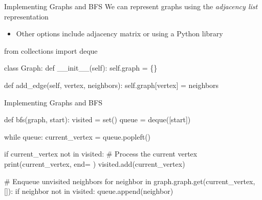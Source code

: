 \documentclass[
  ignorenonframetext,
]{beamer}
\newenvironment{Shaded}{\begin{snugshade}}{\end{snugshade}}
\newcommand{\BuiltInTok}[1]{\textcolor[rgb]{0.00,0.23,0.31}{#1}}
\newcommand{\CommentTok}[1]{\textcolor[rgb]{0.37,0.37,0.37}{#1}}
\newcommand{\ControlFlowTok}[1]{\textcolor[rgb]{0.00,0.23,0.31}{#1}}
\newcommand{\FunctionTok}[1]{\textcolor[rgb]{0.28,0.35,0.67}{#1}}
\newcommand{\ImportTok}[1]{\textcolor[rgb]{0.00,0.46,0.62}{#1}}
\newcommand{\KeywordTok}[1]{\textcolor[rgb]{0.00,0.23,0.31}{#1}}
\newcommand{\NormalTok}[1]{\textcolor[rgb]{0.00,0.23,0.31}{#1}}
\newcommand{\OperatorTok}[1]{\textcolor[rgb]{0.37,0.37,0.37}{#1}}
\newcommand{\StringTok}[1]{\textcolor[rgb]{0.13,0.47,0.30}{#1}}
\newcommand{\VariableTok}[1]{\textcolor[rgb]{0.07,0.07,0.07}{#1}}
\providecommand{\tightlist}{%
  \setlength{\itemsep}{0pt}\setlength{\parskip}{0pt}}\usepackage{longtable,booktabs,array}
\begin{document}
\begin{frame}[fragile]{Implementing Graphs and BFS}
\protect\hypertarget{implementing-graphs-and-bfs}{}
We can represent graphs using the \emph{adjacency list} representation

\begin{itemize}
\tightlist
\item
  Other options include adjacency matrix or using a Python library
\end{itemize}

\begin{Shaded}
\begin{Highlighting}[]
\ImportTok{from}\NormalTok{ collections }\ImportTok{import}\NormalTok{ deque}

\KeywordTok{class}\NormalTok{ Graph:}
  \KeywordTok{def} \FunctionTok{\_\_init\_\_}\NormalTok{(}\VariableTok{self}\NormalTok{):}
    \VariableTok{self}\NormalTok{.graph }\OperatorTok{=}\NormalTok{ \{\}}

  \KeywordTok{def}\NormalTok{ add\_edge(}\VariableTok{self}\NormalTok{, vertex, neighbors):}
    \VariableTok{self}\NormalTok{.graph[vertex] }\OperatorTok{=}\NormalTok{ neighbors}
\end{Highlighting}
\end{Shaded}
\end{frame}

\begin{frame}[fragile]{Implementing Graphs and BFS}
\protect\hypertarget{implementing-graphs-and-bfs-1}{}
\begin{Shaded}
\begin{Highlighting}[]
\KeywordTok{def}\NormalTok{ bfs(graph, start):}
\NormalTok{  visited }\OperatorTok{=} \BuiltInTok{set}\NormalTok{()}
\NormalTok{  queue }\OperatorTok{=}\NormalTok{ deque([start])}

  \ControlFlowTok{while}\NormalTok{ queue:}
\NormalTok{    current\_vertex }\OperatorTok{=}\NormalTok{ queue.popleft()}

    \ControlFlowTok{if}\NormalTok{ current\_vertex }\KeywordTok{not} \KeywordTok{in}\NormalTok{ visited:}
      \CommentTok{\# Process the current vertex}
      \BuiltInTok{print}\NormalTok{(current\_vertex, end}\OperatorTok{=}\StringTok{\textquotesingle{} \textquotesingle{}}\NormalTok{)}
\NormalTok{      visited.add(current\_vertex)}

      \CommentTok{\# Enqueue unvisited neighbors}
      \ControlFlowTok{for}\NormalTok{ neighbor }\KeywordTok{in}\NormalTok{ graph.graph.get(current\_vertex, []):}
        \ControlFlowTok{if}\NormalTok{ neighbor }\KeywordTok{not} \KeywordTok{in}\NormalTok{ visited:}
\NormalTok{          queue.append(neighbor)}
\end{Highlighting}
\end{Shaded}
\end{frame}
\end{document}
